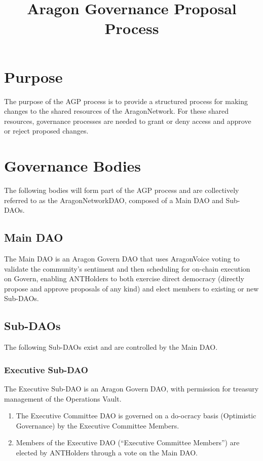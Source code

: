 
\title{Aragon Governance Proposal Process}



\mytitle

\section{Purpose}
The purpose of the \acf{AGP} process is to provide a structured process for making changes to the shared resources of the \gls{AragonNetwork}.
For these shared resources, governance processes are needed to grant or deny access and approve or reject proposed changes.

\section{Governance Bodies}

The following bodies will form part of the \ac{AGP} process and are collectively referred to as the \gls{AragonNetworkDAO}, composed of a Main \ac{DAO} and Sub-\acp{DAO}.

\subsection{Main \ac{DAO}}

The Main \ac{DAO} is an Aragon Govern \ac{DAO} that uses \gls{AragonVoice} voting to validate the community’s sentiment and then scheduling for on-chain execution on Govern, enabling \glspl{ANTHolder} to both exercise direct democracy (directly propose and approve proposals of any kind) and elect members to existing or new Sub-\acp{DAO}.


\subsection{Sub-\acp{DAO}} 

The following Sub-\acp{DAO} exist and are controlled by the Main \ac{DAO}.


\subsubsection*{Executive Sub-\ac{DAO}}

The Executive Sub-\ac{DAO} is an Aragon Govern \ac{DAO}, with permission for treasury management of the Operations Vault.
\begin{enumerate}
	\item The Executive Committee \ac{DAO} is governed on a do-ocracy basis (Optimistic Governance) by the Executive Committee Members.
	\item Members of the Executive \ac{DAO} (``Executive Committee Members'') are elected by \glspl{ANTHolder} through a vote on the Main \ac{DAO}.
\end{enumerate}


